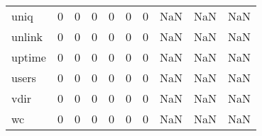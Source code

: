 \begin{longtable}{lrrrrrrrrr}
uniq      &                                       0 &                                                  0 &                                                  0 &                                                  0 &                                                  0 &                                                  0 &                                                NaN &                                    NaN &                                  NaN \\
unlink    &                                       0 &                                                  0 &                                                  0 &                                                  0 &                                                  0 &                                                  0 &                                                NaN &                                    NaN &                                  NaN \\
uptime    &                                       0 &                                                  0 &                                                  0 &                                                  0 &                                                  0 &                                                  0 &                                                NaN &                                    NaN &                                  NaN \\
users     &                                       0 &                                                  0 &                                                  0 &                                                  0 &                                                  0 &                                                  0 &                                                NaN &                                    NaN &                                  NaN \\
vdir      &                                       0 &                                                  0 &                                                  0 &                                                  0 &                                                  0 &                                                  0 &                                                NaN &                                    NaN &                                  NaN \\
wc        &                                       0 &                                                  0 &                                                  0 &                                                  0 &                                                  0 &                                                  0 &                                                NaN &                                    NaN &                                  NaN \\

\end{longtable}
